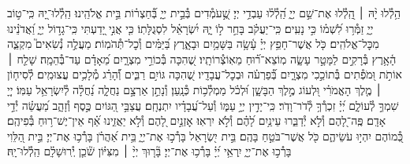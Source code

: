 \documentclass[twoside, openany, parskip=half, 11pt]{book}
\begin{document}
\begin{narrow}
הַ֥לְ֯לוּ יָ֨הּ ׀ \hfill
הַֽ֭לְ֯לוּ אֶת־שֵׁ֣ם יְיָ֑ הַֽ֝לְ֯ל֗וּ עַבְדֵ֥י יְיָ׃
שֶׁ֣֭עֹמְ֯דִים בְּ֯בֵ֣ית יְיָ֑ בְּ֯֝חַצְר֗וֹת בֵּ֣ית אֱלֹהֵֽינוּ׃
הַֽלְ֯לוּ־יָ֭הּ כִּֽי־ט֣וֹב יְיָ֑ זַמְּ֯ר֥וּ לִ֝שְׁמ֗וֹ כִּ֣י נָעִֽים׃
כִּֽי־יַעֲקֹ֗ב בָּחַ֣ר ל֣וֹ יָ֑הּ יִ֝שְׂרָאֵ֗ל לִסְגֻלָּתֽוֹ׃
כִּ֤י אֲנִ֣י יָ֭דַעְתִּי כִּֽי־גָד֣וֹל יְיָ֑ וַ֝אֲדֹנֵ֗ינוּ מִכׇּל־אֱלֹהִֽים׃
כֹּ֤ל אֲשֶׁר־חָפֵ֥ץ יְיָ֗ עָ֫שָׂ֥ה בַּשָּׁמַ֥יִם וּבָאָ֑רֶץ בַּ֝יַּמִּ֗ים וְ֯כׇל־תְּ֯הֹמֽוֹת׃
מַעֲלֶ֣ה נְ֯שִׂאִים֮ מִקְצֵ֢ה הָ֫אָ֥רֶץ בְּ֯רָקִ֣ים לַמָּטָ֣ר עָשָׂ֑ה מֽוֹצֵא־ר֗֝וּחַ מֵאֽוֹצְ֯רוֹתָֽיו׃
שֶׁ֭הִכָּה בְּ֯כוֹרֵ֣י מִצְרָ֑יִם מֵ֝אָדָ֗ם עַד־בְּ֯הֵמָֽה׃
שָׁלַ֤ח ׀ אוֹתֹ֣ת וּ֭מֹפְ֯תִים בְּ֯תוֹכֵ֣כִי מִצְרָ֑יִם בְּ֯֝פַרְעֹ֗ה וּבְכׇל־עֲבָדָֽיו׃
שֶׁ֭הִכָּה גּוֹיִ֣ם רַבִּ֑ים וְ֯֝הָרַ֗ג מְ֯לָכִ֥ים עֲצוּמִֽים׃
לְ֯סִיח֤וֹן ׀ מֶ֤לֶךְ הָאֱמֹרִ֗י וּ֭לְעוֹג מֶ֣לֶךְ הַבָּשָׁ֑ן וּ֝לְכֹ֗ל מַמְלְ֯כ֥וֹת כְּ֯נָֽעַן׃
וְ֯נָתַ֣ן אַרְצָ֣ם נַחֲלָ֑ה נַ֝חֲלָ֗ה לְ֯יִשְׂרָאֵ֥ל עַמּֽוֹ׃
יְיָ֭ שִׁמְךָ֣ לְ֯עוֹלָ֑ם יְ֝יָ֗ זִכְרְ֯ךָ֥ לְ֯דֹר־וָדֹֽר׃
כִּֽי־יָדִ֣ין יְיָ֣ עַמּ֑וֹ וְ֯עַל־עֲ֝בָדָ֗יו יִתְנֶחָֽם׃
עֲצַבֵּ֣י הַ֭גּוֹיִם כֶּ֣סֶף וְ֯זָהָ֑ב מַ֝עֲשֵׂ֗ה יְ֯דֵ֣י אָדָֽם׃
פֶּֽה־לָ֭הֶם וְ֯לֹ֣א יְ֯דַבֵּ֑רוּ עֵינַ֥יִם לָ֝הֶ֗ם וְ֯לֹ֣א יִרְאֽוּ׃
אׇזְנַ֣יִם לָ֭הֶם וְ֯לֹ֣א יַאֲזִ֑ינוּ אַ֗֝ף אֵין־יֶשׁ־ר֥וּחַ בְּ֯פִיהֶֽם׃
כְּ֭֯מוֹהֶם יִהְי֣וּ עֹשֵׂיהֶ֑ם כֹּ֖ל אֲשֶׁר־בֹּטֵ֣חַ בָּהֶֽם׃
בֵּ֣ית יִ֭שְׂרָאֵל בָּרְ֯כ֣וּ אֶת־יְיָ֑ בֵּ֥ית אַ֝הֲרֹ֗ן בָּרְ֯כ֥וּ אֶת־יְיָ׃
בֵּ֣ית הַ֭לֵּוִי בָּרְ֯כ֣וּ אֶת־יְיָ֑ יִֽרְאֵ֥י יְ֝יָ֗ בָּרְ֯כ֥וּ אֶת־יְיָ׃
בָּ֘ר֤וּךְ יְיָ֨ ׀ מִצִּיּ֗וֹן שֹׁ֘כֵ֤ן יְֽ֯רוּשָׁלָ֗‍ִם הַֽלְ֯לוּ־יָֽהּ׃




\end{narrow}
\end{document}
